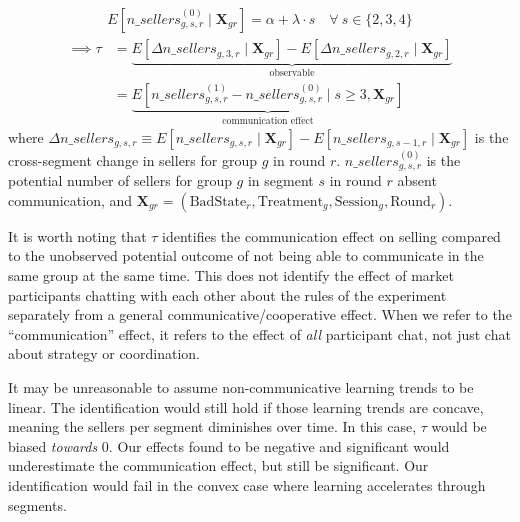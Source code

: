 \documentclass[11pt]{article}
\begin{document}
\begin{equation}
  \begin{split}
E[n\_sellers_{g,s,r}^{(0)} \mid \mathbf{X}_{gr}] = \alpha + \lambda \cdot s \quad \forall \ s \in \{2,3,4\}
  \end{split}
  \end{equation}
  \begin{equation}
  \begin{split}
      \implies \tau &= \underbrace{E[\Delta n\_sellers_{g,3,r} \mid \mathbf{X}_{gr}] - E[\Delta n\_sellers_{g,2,r} \mid \mathbf{X}_{gr}]}_{\text{observable}} \\
      &= \underbrace{E[n\_sellers_{g,s,r}^{(1)} - n\_sellers_{g,s,r}^{(0)} \mid s \geq 3, \mathbf{X}_{gr}]}_{\text{communication effect}}
  \end{split}
  \end{equation}
where $\Delta n\_sellers_{g,s,r} \equiv E[n\_sellers_{g,s,r} \mid \mathbf{X}_{gr}] - E[n\_sellers_{g,s-1,r} \mid \mathbf{X}_{gr}]$ is the cross-segment change in sellers for group $g$ in round $r$. $n\_sellers_{g,s,r}^{(0)}$ is the potential number of sellers for group $g$ in segment $s$ in round $r$ absent communication, and $\mathbf{X}_{gr} = (\text{BadState}_r, \text{Treatment}_g, \text{Session}_g, \text{Round}_r)$.


It is worth noting that $\tau$ identifies the communication effect on selling compared to the unobserved potential outcome of not being able to communicate in the same group at the same time. This does not identify the effect of market participants chatting with each other about the rules of the experiment separately from a general communicative/cooperative effect. When we refer to the ``communication'' effect, it refers to the effect of \textit{all} participant chat, not just chat about strategy or coordination. 

It may be unreasonable to assume non-communicative learning trends to be linear. The identification would still hold if those learning trends are concave, meaning the sellers per segment diminishes over time. In this case, $\tau$ would be biased \textit{towards} 0. Our effects found to be negative and significant would underestimate the communication effect, but still be significant. Our identification would fail in the convex case where learning accelerates through segments.  
\end{document}
